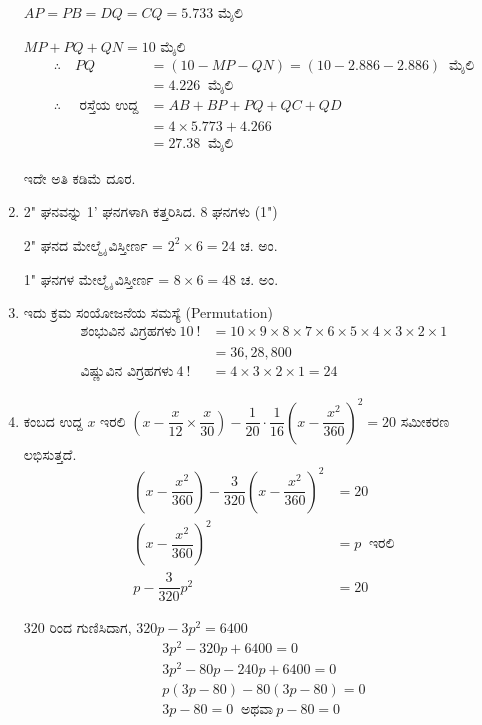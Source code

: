 \begin{enumerate}
$AP = PB = DQ = CQ = 5.733$ ಮೈಲಿ 

$MP + PQ + QN = 10$ ಮೈಲಿ
\begin{align*}
\therefore\quad PQ & = (10 - MP - QN) = (10 - 2.886 - 2.886) ~\text{ ಮೈಲಿ}\\
& = 4.226 ~\text{ ಮೈಲಿ}\\
\therefore\quad \text{ ರಸ್ತೆಯ ಉದ್ದ} & = AB + BP + PQ + QC + QD\\
& = 4 \times 5.773 + 4.266\\
& = 27.38 ~\text{ ಮೈಲಿ}
\end{align*}

ಇದೇ ಅತಿ ಕಡಿಮೆ ದೂರ.

\item 2" ಘನವನ್ನು 1' ಘನಗಳಾಗಿ ಕತ್ತರಿಸಿದ. 8 ಘನಗಳು (1")

2" ಘನದ ಮೇಲ್ಮೈ ವಿಸ್ತೀರ್ಣ = $2^{2} \times 6 = 24$ ಚ. ಅಂ. 

1" ಘನಗಳ ಮೇಲ್ಮೈ ವಿಸ್ತೀರ್ಣ = $8 \times 6 = 48$ ಚ. ಅಂ. 

\item ಇದು ಕ್ರಮ ಸಂಯೋಜನೆಯ ಸಮಸ್ಯೆ (Permutation) 
\begin{align*}
\text{ಶಂಭುವಿನ ವಿಗ್ರಹಗಳು}~ 10~! & = 10 \times 9 \times 8 \times 7 \times 6 \times 5 \times 4 \times 3 \times 2 \times 1\\
& = 36, 28, 800\\
\text{ವಿಷ್ಣುವಿನ ವಿಗ್ರಹಗಳು}~ 4~! & = 4 \times 3 \times 2 \times 1 = 24
\end{align*}

\item ಕಂಬದ ಉದ್ದ $x$ ಇರಲಿ $\left(x - \dfrac{x}{12} \times \dfrac{x}{30}\right) - \dfrac{1}{20} \cdot \dfrac{1}{16} \left(x - \dfrac{x^{2}}{360}\right)^{2} = 20$ ಸಮೀಕರಣ ಲಭಿಸುತ್ತದೆ. 
\begin{align*}
\left(x - \dfrac{x^{2}}{360}\right) - \dfrac{3}{320} \left(x - \dfrac{x^{2}}{360}\right)^{2} & = 20\\
\left(x - \dfrac{x^{2}}{360}\right)^{2} & = p ~\text{ ಇರಲಿ}\\
p - \dfrac{3}{320} p^{2} & = 20
\end{align*}

$320$ ರಿಂದ ಗುಣಿಸಿದಾಗ, $320p - 3p^{2} = 6400$
\begin{gather*}
3p^{2} - 320p + 6400 = 0\\
3p^{2} - 80p - 240p + 6400 = 0\\
p(3p - 80) - 80 (3p - 80) = 0\\
3p - 80 = 0 \ \text{ ಅಥವಾ}\ p - 80 = 0
\end{gather*}


\end{enumerate}
